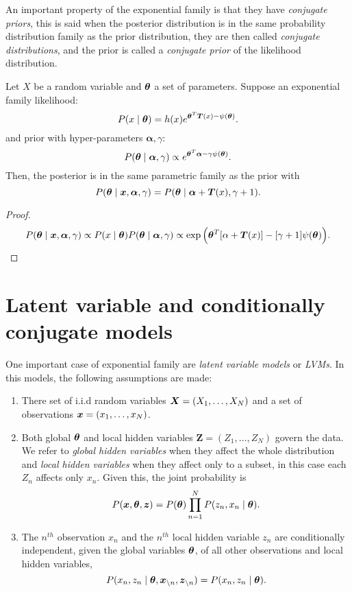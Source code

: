 An important property of the exponential family is that they have \emph{conjugate priors}, this is said when the posterior distribution is in the same probability distribution family as
the prior distribution, they are then called \emph{conjugate distributions}, and
the prior is called a \emph{conjugate prior} of the likelihood distribution.

\begin{proposition}\label{prop:conj_prior}
  Let \(X\) be a random variable and \(\bm{\theta}\) a set of parameters. Suppose an exponential family likelihood:
  \[
    P(x \mid \bm{\theta}) = h(x)e^{\bm{\theta}^{T}\bm{T}(x) - \psi(\bm{\theta})}.
  \]
  and prior with hyper-parameters \(\bm{\alpha}, \gamma\):
  \[
    P(\bm{\theta} \mid \bm{\alpha}, \gamma) \propto e^{\bm{\theta}^{T} \bm{\alpha} - \gamma \psi(\bm{\theta})}.
  \]
  Then, the posterior is in the same parametric family as the prior with
  \[
    P(\bm{\theta} \mid \bm{x}, \bm{\alpha}, \gamma) = P(\bm{\theta} \mid \bm{\alpha} + \bm{T}(x), \gamma + 1).
  \]
\end{proposition}
\begin{proof}
  \[
    P(\bm{\theta} \mid \bm{x}, \bm{\alpha}, \gamma)  \propto P(x \mid \bm{\theta})P(\bm{\theta} \mid \bm{\alpha}, \gamma) \propto \exp \Big( \bm{\theta}^{T}[\alpha + \bm{T}(x)] - [\gamma + 1]\psi(\bm{\theta}) \Big).
  \]
\end{proof}


\section{Latent variable and conditionally conjugate models}

One important case of exponential family are \emph{latent variable models} or \emph{LVMs}. In this models, the following assumptions are made:
\begin{enumerate}\itemsep0.5em
  \item There set of i.i.d random variables \(\bm{X} = (X_{1},\dots,X_{N})\) and a set of observations \(\bm{x} = (x_{1}, \dots, x_{N})\).
  \item Both global \(\bm{\theta}\) and local hidden variables \(\bm{Z} = (Z_{1}, \dots, Z_{N})\) govern the data. We refer to \emph{global hidden variables} when they affect the whole distribution and \emph{local hidden variables} when they affect only to a subset, in this case each \(Z_{n}\) affects only \(x_{n}\). Given this, the joint probability is
    \[
    P(\bm{x}, \bm{\theta}, \bm{z}) = P(\bm{\theta})\prod_{n=1}^{N}P(z_{n}, x_{n} \mid \bm{\theta}).
    \]
  \item The \(n^{th}\) observation \(x_{n}\) and the \(n^{th}\) local hidden variable \(z_{n}\) are conditionally independent, given the global variables \(\bm{\theta}\), of all other observations and local hidden variables,
    \[
    P(x_{n},z_{n} \mid \bm{\theta}, \bm{x}_{\backslash n}, \bm{z}_{\backslash n}) = P(x_{n}, z_{n} \mid \bm{\theta}).
    \]
\end{enumerate}

